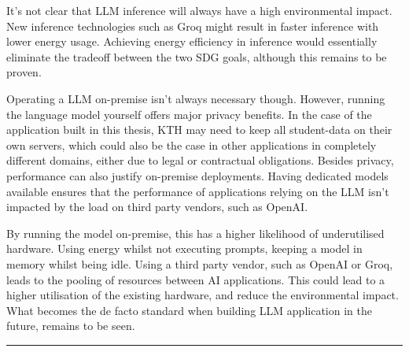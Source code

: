 It’s not clear that \gls{LLM} inference will always have a high environmental impact. New inference technologies such as Groq \cite{abts_software-defined_2022} might result in faster inference with lower energy usage. Achieving energy efficiency in inference would essentially eliminate the tradeoff between the two \gls{SDG} goals, although this remains to be proven.


Operating a \gls{LLM} on-premise isn't always necessary though. However, running the language model yourself offers major privacy benefits. In the case of the application built in this thesis, KTH may need to keep all student-data on their own servers, which could also be the case in other applications in completely different domains, either due to legal or contractual obligations. Besides privacy, performance can also justify on-premise deployments. Having dedicated models available ensures that the performance of applications relying on the \gls{LLM} isn't impacted by the load on third party vendors, such as OpenAI.


By running the model on-premise, this has a higher likelihood of underutilised hardware. Using energy whilst not executing prompts, keeping a model in memory whilst being idle. Using a third party vendor, such as OpenAI or Groq, leads to the pooling of resources between AI applications. This could lead to a higher utilisation of the existing hardware, and reduce the environmental impact. What becomes the de facto standard when building \gls{LLM} application in the future, remains to be seen.


\noindent\rule{\textwidth}{0.4mm}




\cleardoublepage